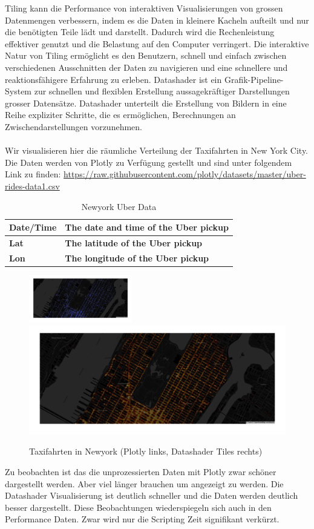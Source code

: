 \documentclass{article}
\begin{document}
Tiling kann die Performance von interaktiven Visualisierungen von grossen Datenmengen verbessern, 
indem es die Daten in kleinere Kacheln aufteilt und nur die benötigten Teile lädt und darstellt. 
Dadurch wird die Rechenleistung effektiver genutzt und die Belastung auf den Computer verringert. 
Die interaktive Natur von Tiling ermöglicht es den Benutzern, schnell und einfach zwischen verschiedenen 
Ausschnitten der Daten zu navigieren und eine schnellere und reaktionsfähigere Erfahrung zu erleben.\cite{noauthor_map_nodate}
Datashader ist ein Grafik-Pipeline-System zur schnellen und flexiblen Erstellung aussagekräftiger Darstellungen grosser Datensätze. Datashader unterteilt die Erstellung von Bildern in eine Reihe expliziter Schritte, die es ermöglichen, Berechnungen an Zwischendarstellungen vorzunehmen.\cite{wong_abstract_2013}
\\
\\
Wir visualisieren hier die räumliche Verteilung der Taxifahrten in New York City. 
Die Daten werden von Plotly zu Verfügung gestellt und sind unter folgendem Link zu finden: \url{https://raw.githubusercontent.com/plotly/datasets/master/uber-rides-data1.csv}

\begin{table}[!h]
\centering
\begin{tabular}{|l|l|}
\hline
\textbf{Date/Time} & \textbf{The date and time of the Uber pickup} \\
\hline
\textbf{Lat} & \textbf{The latitude of the Uber pickup} \\
\hline
\textbf{Lon} & \textbf{The longitude of the Uber pickup} \\
\hline
\end{tabular}
\caption{\label{tab: LE1 Newyork Taxi Data} Newyork Uber Data}
\end{table}



\begin{figure}[!h]
\centering
\includegraphics[width=0.4\textwidth]{img/newyork_plotly.png}
\includegraphics[height=0.18\textwidth]{img/newyork_datashader.png}
\caption{\label{fig: LE1 Plotly vs Datashader} Taxifahrten in Newyork (Plotly links, Datashader Tiles rechts)}
\end{figure}
\noindent
Zu beobachten ist das die unprozessierten Daten mit Plotly zwar schöner dargestellt werden. Aber viel länger brauchen um angezeigt zu werden. Die Datashader Visualisierung ist deutlich schneller und die Daten werden deutlich besser dargestellt.
Diese Beobachtungen wiederspiegeln sich auch in den Performance Daten. Zwar wird nur die Scripting Zeit signifikant verkürzt.
\end{document}
